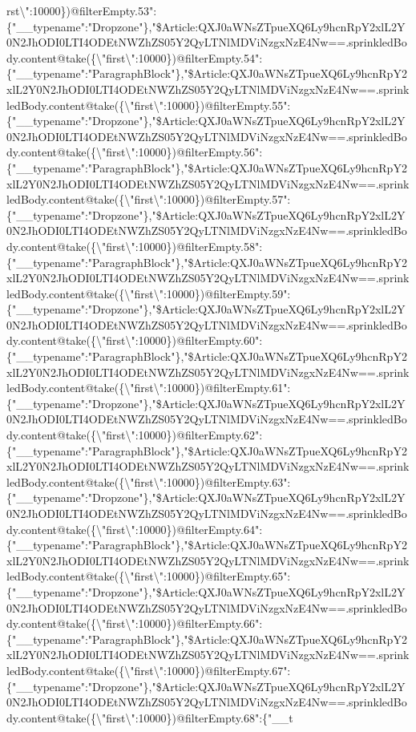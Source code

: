 rst\textbackslash{}":10000\})@filterEmpty.53":\{"\_\_typename":"Dropzone"\},"\$Article:QXJ0aWNsZTpueXQ6Ly9hcnRpY2xlL2Y0N2JhODI0LTI4ODEtNWZhZS05Y2QyLTNlMDViNzgxNzE4Nw==.sprinkledBody.content@take(\{\textbackslash{}"first\textbackslash{}":10000\})@filterEmpty.54":\{"\_\_typename":"ParagraphBlock"\},"\$Article:QXJ0aWNsZTpueXQ6Ly9hcnRpY2xlL2Y0N2JhODI0LTI4ODEtNWZhZS05Y2QyLTNlMDViNzgxNzE4Nw==.sprinkledBody.content@take(\{\textbackslash{}"first\textbackslash{}":10000\})@filterEmpty.55":\{"\_\_typename":"Dropzone"\},"\$Article:QXJ0aWNsZTpueXQ6Ly9hcnRpY2xlL2Y0N2JhODI0LTI4ODEtNWZhZS05Y2QyLTNlMDViNzgxNzE4Nw==.sprinkledBody.content@take(\{\textbackslash{}"first\textbackslash{}":10000\})@filterEmpty.56":\{"\_\_typename":"ParagraphBlock"\},"\$Article:QXJ0aWNsZTpueXQ6Ly9hcnRpY2xlL2Y0N2JhODI0LTI4ODEtNWZhZS05Y2QyLTNlMDViNzgxNzE4Nw==.sprinkledBody.content@take(\{\textbackslash{}"first\textbackslash{}":10000\})@filterEmpty.57":\{"\_\_typename":"Dropzone"\},"\$Article:QXJ0aWNsZTpueXQ6Ly9hcnRpY2xlL2Y0N2JhODI0LTI4ODEtNWZhZS05Y2QyLTNlMDViNzgxNzE4Nw==.sprinkledBody.content@take(\{\textbackslash{}"first\textbackslash{}":10000\})@filterEmpty.58":\{"\_\_typename":"ParagraphBlock"\},"\$Article:QXJ0aWNsZTpueXQ6Ly9hcnRpY2xlL2Y0N2JhODI0LTI4ODEtNWZhZS05Y2QyLTNlMDViNzgxNzE4Nw==.sprinkledBody.content@take(\{\textbackslash{}"first\textbackslash{}":10000\})@filterEmpty.59":\{"\_\_typename":"Dropzone"\},"\$Article:QXJ0aWNsZTpueXQ6Ly9hcnRpY2xlL2Y0N2JhODI0LTI4ODEtNWZhZS05Y2QyLTNlMDViNzgxNzE4Nw==.sprinkledBody.content@take(\{\textbackslash{}"first\textbackslash{}":10000\})@filterEmpty.60":\{"\_\_typename":"ParagraphBlock"\},"\$Article:QXJ0aWNsZTpueXQ6Ly9hcnRpY2xlL2Y0N2JhODI0LTI4ODEtNWZhZS05Y2QyLTNlMDViNzgxNzE4Nw==.sprinkledBody.content@take(\{\textbackslash{}"first\textbackslash{}":10000\})@filterEmpty.61":\{"\_\_typename":"Dropzone"\},"\$Article:QXJ0aWNsZTpueXQ6Ly9hcnRpY2xlL2Y0N2JhODI0LTI4ODEtNWZhZS05Y2QyLTNlMDViNzgxNzE4Nw==.sprinkledBody.content@take(\{\textbackslash{}"first\textbackslash{}":10000\})@filterEmpty.62":\{"\_\_typename":"ParagraphBlock"\},"\$Article:QXJ0aWNsZTpueXQ6Ly9hcnRpY2xlL2Y0N2JhODI0LTI4ODEtNWZhZS05Y2QyLTNlMDViNzgxNzE4Nw==.sprinkledBody.content@take(\{\textbackslash{}"first\textbackslash{}":10000\})@filterEmpty.63":\{"\_\_typename":"Dropzone"\},"\$Article:QXJ0aWNsZTpueXQ6Ly9hcnRpY2xlL2Y0N2JhODI0LTI4ODEtNWZhZS05Y2QyLTNlMDViNzgxNzE4Nw==.sprinkledBody.content@take(\{\textbackslash{}"first\textbackslash{}":10000\})@filterEmpty.64":\{"\_\_typename":"ParagraphBlock"\},"\$Article:QXJ0aWNsZTpueXQ6Ly9hcnRpY2xlL2Y0N2JhODI0LTI4ODEtNWZhZS05Y2QyLTNlMDViNzgxNzE4Nw==.sprinkledBody.content@take(\{\textbackslash{}"first\textbackslash{}":10000\})@filterEmpty.65":\{"\_\_typename":"Dropzone"\},"\$Article:QXJ0aWNsZTpueXQ6Ly9hcnRpY2xlL2Y0N2JhODI0LTI4ODEtNWZhZS05Y2QyLTNlMDViNzgxNzE4Nw==.sprinkledBody.content@take(\{\textbackslash{}"first\textbackslash{}":10000\})@filterEmpty.66":\{"\_\_typename":"ParagraphBlock"\},"\$Article:QXJ0aWNsZTpueXQ6Ly9hcnRpY2xlL2Y0N2JhODI0LTI4ODEtNWZhZS05Y2QyLTNlMDViNzgxNzE4Nw==.sprinkledBody.content@take(\{\textbackslash{}"first\textbackslash{}":10000\})@filterEmpty.67":\{"\_\_typename":"Dropzone"\},"\$Article:QXJ0aWNsZTpueXQ6Ly9hcnRpY2xlL2Y0N2JhODI0LTI4ODEtNWZhZS05Y2QyLTNlMDViNzgxNzE4Nw==.sprinkledBody.content@take(\{\textbackslash{}"first\textbackslash{}":10000\})@filterEmpty.68":\{"\_\_t